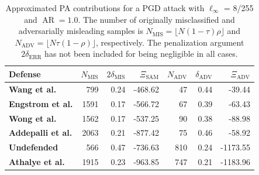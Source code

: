 \begin{table}[H]
    \centering
    \begin{tabular}{l|rrr|rrr}
    Defense & $N_{\text{MIS}}$ & $2 \delta_{\text{MIS}}$ & $\Xi_{\text{SAM}}$ & $N_{\text{ADV}}$ & $\delta_{\text{ADV}}$ & $\Xi_{\text{ADV}}$ \\
    \midrule
    {\color{tab:brown} \textbf{Wang et al.}} & 799 & 0.24 & -468.62 & 47 & 0.44 & -39.44 \\
    {\color{tab:blue} \textbf{Engstrom et al.}} & 1591 & 0.17 & -566.72 & 67 & 0.39 & -63.43 \\
    {\color{tab:red} \textbf{Wong et al.}} & 1562 & 0.17 & -537.25 & 90 & 0.38 & -88.98 \\
    {\color{tab:purple} \textbf{Addepalli et al.}} & 2063 & 0.21 & -877.42 & 75 & 0.46 & -58.92 \\
    {\color{tab:orange} \textbf{Undefended}} & 566 & 0.47 & -736.63 & 810 & 0.24 & -1173.55 \\
    {\color{tab:green} \textbf{Athalye et al.}} & 1915 & 0.23 & -963.85 & 747 & 0.21 & -1183.96 \\
    \bottomrule
    \end{tabular}
    \caption{
    Approximated PA contributions for a PGD attack with $\ell_\infty$ = 8/255 and
    $\operatorname{AR} = 1.0$. The number of originally misclassified and adversarially misleading
    samples is $N_{\text{MIS}} = \lfloor N (1-\tau) \rho \rfloor$ and
    $N_{\text{ADV}} = \lfloor N \tau (1-\rho) \rfloor$, respectively. 
    The penalization argument $2 \delta_{\text{ERR}}$ has not
    been included for being negligible in all cases.
    }
    \label{tab:approx_pa_pgd_table}
\end{table}

